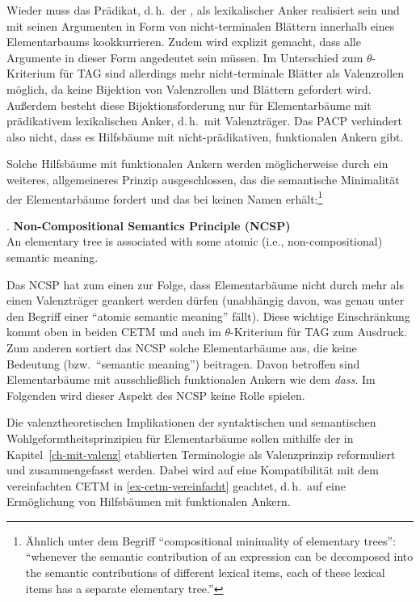 Wieder muss das Prädikat, d.\,h.\ der , als lexikalischer Anker realisiert sein und mit seinen Argumenten in Form von nicht-terminalen Blättern innerhalb eines Elementarbaums kookkurrieren. Zudem wird explizit gemacht, dass alle Argumente in dieser Form angedeutet sein müssen. Im Unterschied zum $\theta$-Kriterium für TAG sind allerdings mehr nicht-terminale Blätter als Valenzrollen möglich, da keine Bijektion von Valenzrollen und Blättern gefordert wird. Au\ss erdem  besteht diese Bijektionsforderung nur für Elementarbäume mit prädikativem lexikalischen Anker, d.\,h.\ mit Valenzträger. Das PACP verhindert also nicht, dass es Hilfsbäume mit nicht-prädikativen, funktionalen Ankern gibt.  

Solche Hilfsbäume mit funktionalen Ankern werden möglicherweise durch ein weiteres, allgemeineres Prinzip ausgeschlossen, das die semantische Minimalität der Elementarbäume fordert und das bei \cite{Abeille:Rambow:00} keinen Namen erhält:\footnote{Ähnlich \citet[5]{Kallmeyer:Romero:08} unter dem Begriff "`compositional minimality of elementary trees"': "`whenever the semantic contribution of an expression can be decomposed into the semantic contributions of different lexical items, each of these lexical items has a separate elementary tree."'}

\ex. {\bf Non-Compositional Semantics Principle (NCSP)} \\
An elementary tree is associated with some atomic (i.e., non-compositio\-nal) semantic meaning.

Das NCSP hat zum einen zur Folge, dass Elementarbäume nicht durch mehr als einen Valenzträger geankert werden dürfen (unabhängig davon, was genau unter den Begriff einer "`atomic semantic meaning"' fällt). Diese wichtige Einschränkung kommt oben in beiden CETM und auch im $\theta$-Kriterium für TAG zum Ausdruck. Zum anderen sortiert das NCSP solche Elementarbäume aus, die keine Bedeutung (bzw.\ "`semantic meaning"') beitragen. Davon betroffen sind Elementarbäume mit ausschließlich funktionalen Ankern wie dem  \textit{dass}. Im Folgenden wird dieser Aspekt des NCSP keine Rolle spielen. 

Die valenztheoretischen Implikationen der syntaktischen und semantischen Wohlgeformtheitsprinzipien für Elementarbäume sollen mithilfe der in Kapitel~\ref{ch-mit-valenz} etablierten Terminologie als Valenzprinzip reformuliert und zusammengefasst werden. Dabei wird auf eine Kompatibilität mit dem vereinfachten CETM in \ref{ex-cetm-vereinfacht} geachtet, d.\,h.\ auf eine Ermöglichung von Hilfsbäumen mit funktionalen Ankern.

